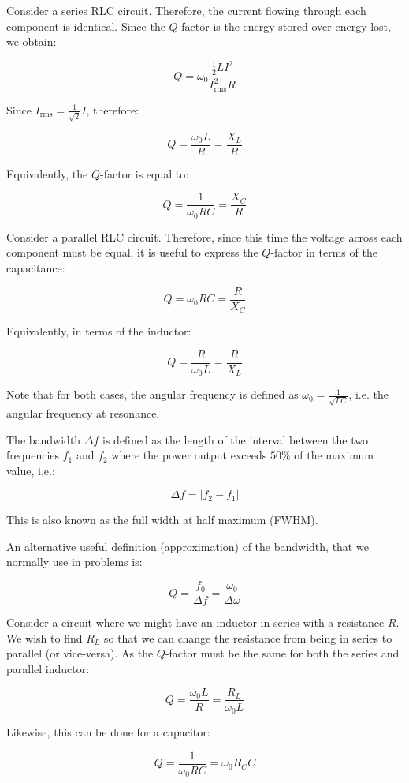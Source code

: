 \documentclass{article}
\begin{document}
\begin{proposition}
    Consider a series RLC circuit. Therefore, the current flowing through each component is identical. Since the $Q$-factor is the energy stored over energy lost, we obtain:

    \[ Q = \omega_0\frac{\frac{1}{2}LI^2}{I_{\text{rms}}^2R} \]

    Since $I_{\text{rms}} = \frac{1}{\sqrt{2}}I$, therefore:

    \[ Q = \frac{\omega_0L}{R} = \frac{X_L}{R} \]

    Equivalently, the $Q$-factor is equal to:

    \[ Q = \frac{1}{\omega_0RC} = \frac{X_C}{R} \]
\end{proposition}

\begin{proposition}
    Consider a parallel RLC circuit. Therefore, since this time the voltage across each component must be equal, it is useful to express the $Q$-factor in terms of the capacitance:

    \[ Q = \omega_0RC = \frac{R}{X_C} \]

    Equivalently, in terms of the inductor:

    \[ Q = \frac{R}{\omega_0L} = \frac{R}{X_L} \]
\end{proposition}

Note that for both cases, the angular frequency is defined as $\omega_0 = \frac{1}{\sqrt{LC}}$, i.e. the angular frequency at resonance.

\begin{definition}[Bandwidth]
    The bandwidth $\Delta f$ is defined as the length of the interval between the two frequencies $f_1$ and $f_2$ where the power output exceeds $50\%$ of the maximum value, i.e.:

    \[ \Delta f = |f_2 - f_1| \]

    This is also known as the full width at half maximum (FWHM).
\end{definition}

\begin{proposition}
    An alternative useful definition (approximation) of the bandwidth, that we normally use in problems is:

    \[ Q = \frac{f_0}{\Delta f} = \frac{\omega_0}{\Delta \omega} \]
\end{proposition}

\begin{proposition}
    Consider a circuit where we might have an inductor in series with a resistance $R$. We wish to find $R_L$ so that we can change the resistance from being in series to parallel (or vice-versa). As the $Q$-factor must be the same for both the series and parallel inductor:

    \[ Q = \frac{\omega_0L}{R} = \frac{R_L}{\omega_0L} \]

    Likewise, this can be done for a capacitor:

    \[ Q = \frac{1}{\omega_0RC} = \omega_0R_CC \]
\end{proposition}
\end{document}
